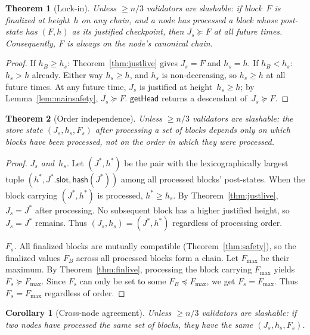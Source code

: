 \ifx\litemode\undefined\documentclass{article}\fi
\theoremstyle{plain}
\newtheorem{theorem}{Theorem}
\newtheorem{corollary}{Corollary}
\theoremstyle{definition}
\theoremstyle{remark}
\begin{document}
\begin{theorem}[Lock-in]\label{thm:lockin}
Unless $\geq n/3$ validators are slashable: if block~$F$ is finalized at height~$h$ on any chain, and a node has processed a block whose post-state has $(F, h)$ as its justified checkpoint, then $J_s \succeq F$ at all future times.
Consequently, $F$ is always on the node's canonical chain.
\end{theorem}

\begin{proof}
If $h_B \geq h_s$: Theorem~\ref{thm:justlive} gives $J_s = F$ and $h_s = h$.
If $h_B < h_s$: $h_s > h$ already.
Either way $h_s \geq h$, and $h_s$ is non-decreasing, so $h_s \geq h$ at all future times.
At any future time, $J_s$ is justified at height~$h_s \geq h$; by Lemma~\ref{lem:mainsafety}, $J_s \succeq F$.
$\textsf{getHead}$ returns a descendant of~$J_s \succeq F$.
\end{proof}

\begin{theorem}[Order independence]\label{thm:orderindep}
Unless $\geq n/3$ validators are slashable: the store state $(J_s, h_s, F_s)$ after processing a set of blocks depends only on \emph{which} blocks have been processed, not on the order in which they were processed.
\end{theorem}

\begin{proof}
\emph{$J_s$ and~$h_s$.}
Let $(J^*, h^*)$ be the pair with the lexicographically largest tuple $(h^*, J^*\!.\mathsf{slot}, \mathsf{hash}(J^*))$ among all processed blocks' post-states.
When the block carrying $(J^*, h^*)$ is processed, $h^* \geq h_s$.
By Theorem~\ref{thm:justlive}, $J_s = J^*$ after processing.
No subsequent block has a higher justified height, so $J_s = J^*$ remains.
Thus $(J_s, h_s) = (J^*, h^*)$ regardless of processing order.

\emph{$F_s$.}
All finalized blocks are mutually compatible (Theorem~\ref{thm:safety}), so the finalized values $F_B$ across all processed blocks form a chain.
Let $F_{\max}$ be their maximum.
By Theorem~\ref{thm:finlive}, processing the block carrying $F_{\max}$ yields $F_s \succeq F_{\max}$.
Since $F_s$ can only be set to some $F_B \preceq F_{\max}$, we get $F_s = F_{\max}$.
Thus $F_s = F_{\max}$ regardless of order.
\end{proof}

\begin{corollary}[Cross-node agreement]\label{cor:agreement}
Unless $\geq n/3$ validators are slashable: if two nodes have processed the same set of blocks, they have the same $(J_s, h_s, F_s)$.
\end{corollary}
\end{document}
